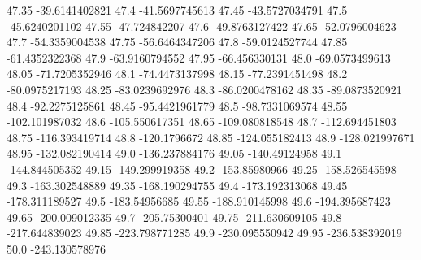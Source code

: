           47.35   -39.6141402821
           47.4   -41.5697745613
          47.45   -43.5727034791
           47.5   -45.6240201102
          47.55    -47.724842207
           47.6   -49.8763127422
          47.65   -52.0796004623
           47.7   -54.3359004538
          47.75   -56.6464347206
           47.8   -59.0124527744
          47.85   -61.4352322368
           47.9   -63.9160794552
          47.95    -66.456330131
           48.0   -69.0573499613
          48.05   -71.7205352946
           48.1   -74.4473137998
          48.15   -77.2391451498
           48.2   -80.0975217193
          48.25   -83.0239692976
           48.3   -86.0200478162
          48.35   -89.0873520921
           48.4   -92.2275125861
          48.45   -95.4421961779
           48.5   -98.7331069574
          48.55   -102.101987032
           48.6   -105.550617351
          48.65   -109.080818548
           48.7   -112.694451803
          48.75   -116.393419714
           48.8     -120.1796672
          48.85   -124.055182413
           48.9   -128.021997671
          48.95   -132.082190414
           49.0   -136.237884176
          49.05    -140.49124958
           49.1   -144.844505352
          49.15   -149.299919358
           49.2    -153.85980966
          49.25   -158.526545598
           49.3   -163.302548889
          49.35   -168.190294755
           49.4   -173.192313068
          49.45   -178.311189527
           49.5    -183.54956685
          49.55   -188.910145998
           49.6   -194.395687423
          49.65   -200.009012335
           49.7    -205.75300401
          49.75   -211.630609105
           49.8   -217.644839023
          49.85   -223.798771285
           49.9   -230.095550942
          49.95   -236.538392019
           50.0   -243.130578976
